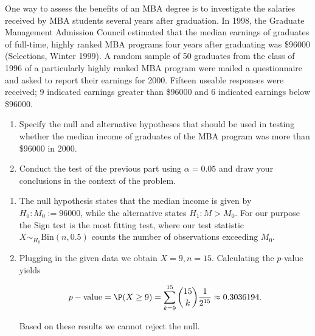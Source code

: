 
\begin{exercise}

One way to assess the benefits of an MBA degree is to investigate the salaries
received by MBA students several years after graduation.
In 1998, the Graduate Management Admission Council estimated that the
median earnings of graduates of full-time, highly ranked MBA programs
four years after graduating was \$96000 (Selections, Winter 1999).
A random sample of 50 graduates from the class of 1996 of a particularly
highly ranked MBA program were mailed a questionnaire and asked to report
their earnings for 2000. Fifteen useable responses were received;
9 indicated earnings greater than \$96000 and 6 indicated earnings below
\$96000.

\begin{enumerate}[label = (\alph*)]
    \item Specify the null and alternative hypotheses that should be
    used in testing whether the median income of graduates of the MBA
    program was more than \$96000 in 2000.
    \item Conduct the test of the previous part using $\alpha = 0.05$ and
    draw your conclusions in the context of the problem. 
\end{enumerate}

\end{exercise}


\begin{solution}

\phantom{}

    \begin{enumerate}[label = (\alph*)]
        \item The null hypothesis states that the median income is given by $H_0: M_0 := 96000$,
        while the alternative states $H_1: M > M_0$.
        For our purpose the Sign test is the most fitting test, where our
        test statistic $X \sim_{H_0} \text{Bin}(n, 0.5)$ counts the number
         of observations exceeding $M_0$.
        \item Plugging in the given data we obtain $X = 9, n = 15$.
        Calculating the $p$-value yields

        \begin{align*}
            p-\text{value} = \P(X \geq 9) = \sum_{k=9}^{15}\binom{15}{k}\frac{1}{2^{15}}
            \approx 0.3036194.
        \end{align*}

        Based on these results we cannot reject the null.
    \end{enumerate}

\end{solution}

